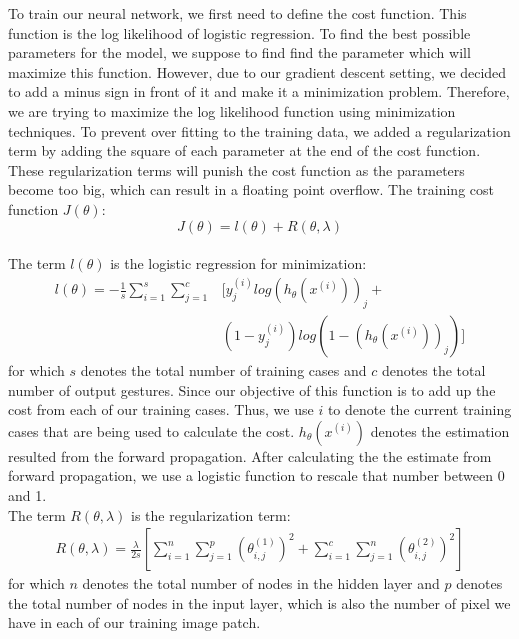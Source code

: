 \documentclass[conference]{IEEEtran}
\begin{document}
To train our neural network, we first need to define the cost function. This function is the log likelihood of logistic regression. To find the best possible parameters for the model, we suppose to find find the parameter which will maximize this function. However, due to our gradient descent setting, we decided to add a minus sign in front of it and make it a minimization problem. Therefore, we are trying to maximize the log likelihood function using minimization techniques. To prevent over fitting to the training data, we added a regularization term by adding the square of each parameter at the end of the cost function. These regularization terms will punish the cost function as the parameters become too big, which can result in a floating point overflow. The training cost function $J(\theta)$:
\begin{equation}
J(\theta) = l(\theta) + R(\theta, \lambda)
\end{equation}
\\
The term $l(\theta)$ is the logistic regression for minimization: 
\begin{equation}
\begin{split}
l(\theta) = -\frac{1}{s}\sum_{i=1}^{s} \sum_{j=1}^c 
& [y_j^{(i)}log(h_{\theta}(x^{(i)}))_j + \\
& (1-y_j^{(i)})log(1-(h_\theta(x^{(i)}))_j)]
\end{split}
\end{equation}
for which $s$ denotes the total number of training cases and $c$ denotes the total number of output gestures. Since our objective of this function is to add up the cost from each of our training cases. Thus, we use $i$ to denote the current training cases that are being used to calculate the cost. $h_{\theta}(x^{(i)})$ denotes the estimation resulted from the forward propagation. After calculating the the estimate from forward propagation, we use a logistic function to rescale that number between 0 and 1.
\\
The term $R(\theta, \lambda)$ is the regularization term: 
\begin{equation}
\begin{split}
R(\theta, \lambda) = \frac{\lambda}{2s}[ \sum_{i=1}^{n} \sum_{j=1}^{p} (\theta_{i,j}^{(1)})^2 + \sum_{i=1}^{c} \sum_{j=1}^{n} (\theta_{i,j}^{(2)})^2]
\end{split}
\end{equation}
for which $n$ denotes the total number of nodes in the hidden layer and $p$ denotes the total number of nodes in the input layer, which is also the number of pixel we have in each of our training image patch.
\end{document}
